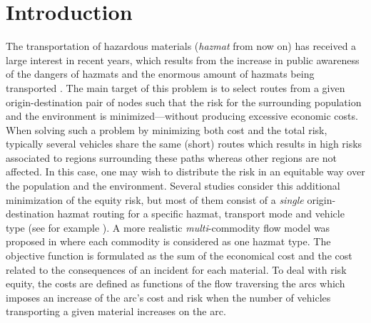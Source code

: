\documentclass[preprint,12pt]{elsarticle}
\begin{document}
\section{Introduction}
The transportation of hazardous materials ({\em hazmat} from now on) has received a large interest in recent years, which results from the increase in public awareness of the dangers of hazmats and the enormous amount of hazmats being transported \cite{CAR08}. The main target of this problem is to select routes from a given origin-destination pair of nodes such that the risk for the surrounding population and the environment is minimized---without producing excessive economic costs. 
%
When solving such a problem by minimizing both cost and the total risk, typically several vehicles share the same (short) routes which results in high risks associated to regions surrounding these paths whereas other regions are not affected. In this case, one may wish to distribute the risk in an equitable way over the population and the environment. Several studies consider this additional minimization of the equity risk, but most of them consist of a \emph{single} origin-destination hazmat routing for a specific hazmat, transport mode and vehicle type (see for example \cite{AKG02, CAR08}).
% 
% 
%
A more realistic \emph{multi}-commodity flow model was proposed in \citep{CAR08} where each commodity is considered as one hazmat type. The objective function is formulated as the sum of the economical cost and the cost related to the consequences of an incident for each material. To deal with risk equity, the costs are defined as functions of the flow traversing the arcs which imposes an increase of the arc's cost and risk when the number of vehicles transporting a given material increases on the arc.
\end{document}
